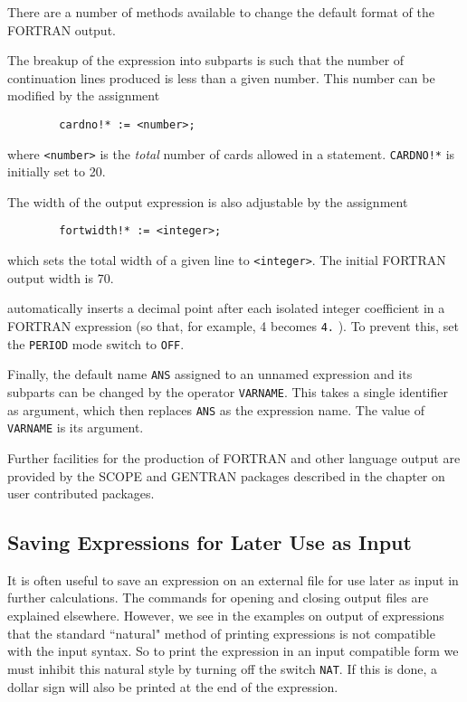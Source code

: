 There are a number of methods available to change the default format of the
FORTRAN output.

The breakup of the expression into subparts is such that the number of
continuation lines produced is less than a given number. This number can
be modified by the assignment
\begin{verbatim}
        cardno!* := <number>;
\end{verbatim}
where {\tt <number>} is the {\em total} number of cards allowed in a
statement. {\tt CARDNO!*} is initially set to 20.

The width of the output expression is also adjustable by the assignment
\begin{verbatim}
        fortwidth!* := <integer>;
\end{verbatim}
which sets the total width of a given line to {\tt <integer>}. The initial
FORTRAN output width is 70.

{\REDUCE} automatically inserts a decimal point after each isolated integer
coefficient in a FORTRAN expression (so that, for example, 4 becomes
{\tt 4.} ). To prevent this, set the {\tt PERIOD} 
mode switch to {\tt OFF}.

Finally, the default name {\tt ANS} assigned to an unnamed expression and
its subparts can be changed by the operator {\tt VARNAME}.
  This takes a single identifier as argument, which then
replaces {\tt ANS} as the expression name.  The value of {\tt VARNAME} is
its argument.

Further facilities for the production of FORTRAN and other language output
are provided by the SCOPE and GENTRAN packages described in the chapter on
user contributed packages.

\subsection{Saving Expressions for Later Use as Input}

It is often useful to save an expression on an external file for use later
as input in further calculations. The commands for opening and closing
output files are explained elsewhere. However, we see in the examples on
output of expressions that the standard ``natural" method of printing
expressions is not compatible with the input syntax. So to print the
expression in an input compatible form we must inhibit this natural style
by turning off the switch {\tt NAT}.  If this is done, a
dollar sign will also be printed at the end of the expression.

